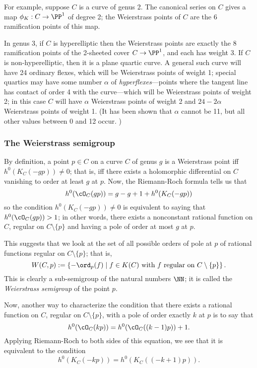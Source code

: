 For example, suppose $C$ is a curve of genus 2. The canonical series on $C$ gives a map $\phi_K : C \to \PP^1$ of degree 2; the Weierstrass points of $C$ are the 6 ramification points of this map. 

In genus 3, if $C$ is hyperelliptic then the Weierstrass points are exactly the 8 ramification points of the 2-sheeted cover $C \to \PP^1$, and each has weight 3. If $C$ is non-hyperelliptic, then it is a plane quartic curve. A general such curve will have 24 ordinary flexes, which will be Weierstrass points of weight 1; special quartics may have some number $\alpha$ of \emph{hyperflexes}---points where the tangent line has contact of order 4 with the curve---which will be Weierstrass points of weight 2; in this case $C$ will have $\alpha$ Weierstrass points of weight 2 and $24-2\alpha$ Weierstrass points of weight 1. (It has been shown that $\alpha$ cannot be 11, but  all  other values  between 0 and 12 occur. )

\subsubsection{The Weierstrass semigroup} 

By definition, a point $p \in C$ on a curve $C$ of genus $g$ is a Weierstrass point iff $h^0(K_C(-gp)) \neq 0$; that is, iff there exists a holomorphic differential on $C$ vanishing to order at least $g$ at $p$. Now, the Riemann-Roch formula tells us that
$$
h^0(\cO_C(gp)) = g - g + 1 + h^0(K_C(-gp))
$$
so the condition $h^0(K_C(-gp)) \neq 0$ is equivalent to saying that $h^0(\cO_C(gp)) > 1$; in other words, there exists a nonconstant rational function on $C$, regular on $C \setminus \{p\}$ and having a pole of order at most $g$ at $p$.

This suggests that we look at the set of all possible orders of pole at $p$ of rational functions regular on $C \setminus \{p\}$; that is,
$$
W(C,p) := \left\{ -\ord_p(f) \mid f \in K(C) \text{ with $f$ regular on } C \setminus \{p\} \right\}.
$$
This is clearly a sub-semigroup of the natural numbers $\NN$; it is called the \emph{Weierstrass semigroup} of the point $p$.  

Now, another way to characterize the condition that there exists a rational function on $C$, regular on $C \setminus \{p\}$, with a pole of order exactly $k$ at $p$ is to say that
$$
h^0(\cO_C(kp)) = h^0(\cO_C((k-1)p)) + 1.
$$
Applying Riemann-Roch to both sides of this equation, we see that it is equivalent to the condition
$$
h^0(K_C(-kp)) = h^0(K_C((-k+1)p)).
$$

